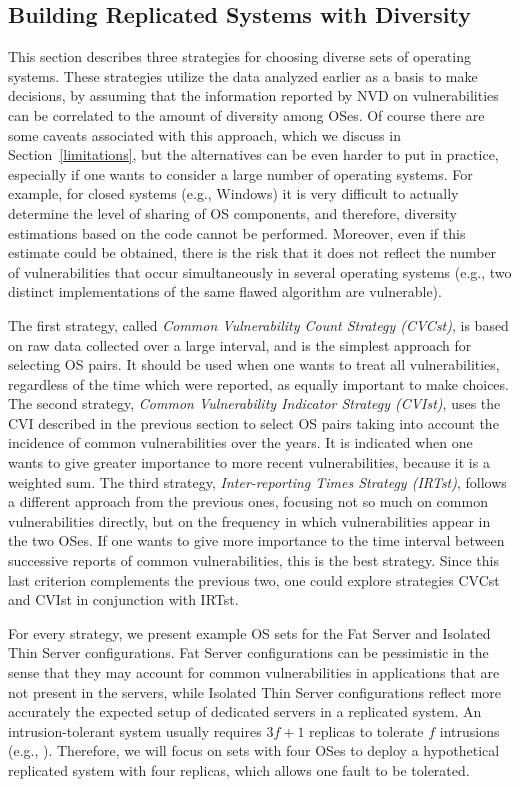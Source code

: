 \subsection*{Building Replicated Systems with Diversity}
\label{build_diversity}
This section describes three strategies for choosing diverse sets of operating systems. These strategies utilize the data analyzed earlier as a basis to make decisions, by assuming that the information reported by NVD on vulnerabilities can be correlated to the amount of diversity among OSes. Of course there are some caveats associated with this approach, which we discuss in Section~\ref{limitations}, but the alternatives can be even harder to put in practice, especially if one wants to consider a large number of operating systems. For example, for closed systems (e.g., Windows) it is very difficult to actually determine the level of sharing of OS components, and therefore, diversity estimations based on the code cannot be performed. Moreover, even if this estimate could be obtained, there is the risk that it does not reflect the number of vulnerabilities that occur simultaneously in several operating systems (e.g., two distinct implementations of the same flawed algorithm are vulnerable).

The first strategy, called \emph{Common Vulnerability Count Strategy (CVCst)}, is based on raw data collected over a large interval, and is the simplest approach for selecting OS pairs. It should be used when one wants to treat all vulnerabilities, regardless of the time which were reported, as equally important to make choices. The second strategy, \emph{Common Vulnerability Indicator Strategy (CVIst)}, uses the CVI described in the previous section to select OS pairs taking into account the incidence of common vulnerabilities over the years. It is indicated when one wants to give greater importance to more recent vulnerabilities, because it is a weighted sum. The third strategy, \emph{Inter-reporting Times Strategy (IRTst)}, follows a different approach from the previous ones, focusing not so much on common vulnerabilities directly, but on the frequency in which vulnerabilities appear in the two OSes. If one wants to give more importance to the time interval between successive reports of common vulnerabilities, this is the best strategy. Since this last criterion complements the previous two, one could explore strategies CVCst and CVIst in conjunction with IRTst.

For every strategy, we present example OS sets for the Fat Server and Isolated Thin Server configurations. Fat Server configurations can be pessimistic in the sense that they may account for common vulnerabilities in applications that are not present in the servers, while Isolated Thin Server configurations reflect more accurately the expected setup of dedicated servers in a replicated system. An intrusion-tolerant system usually requires $3f+1$ replicas to tolerate $f$ intrusions (e.g., \cite{Ver03,Cas02,Bessani08:depspace,Mon11}). Therefore, we will focus on sets with four OSes to deploy a hypothetical replicated system with four replicas, which allows one fault to be tolerated.

